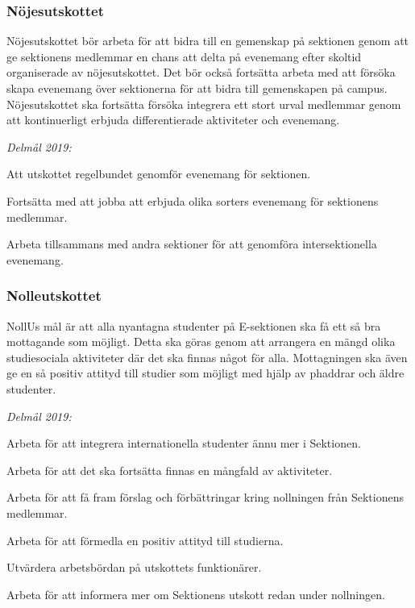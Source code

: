 \documentclass[../_main/handlingar.tex]{subfiles}
\begin{document}
\subsubsection*{Nöjesutskottet}
Nöjesutskottet bör arbeta för att bidra till en gemenskap på sektionen genom att ge sektionens medlemmar en chans att delta på evenemang efter skoltid organiserade av nöjesutskottet. Det bör också fortsätta arbeta med att försöka skapa evenemang över sektionerna för att bidra till gemenskapen på campus. Nöjesutskottet ska fortsätta försöka integrera ett stort urval medlemmar genom att kontinuerligt erbjuda differentierade aktiviteter och evenemang.

\emph{Delmål 2019:}
\begin{dashlist}
    \item Att utskottet regelbundet genomför evenemang för sektionen. 
    \item Fortsätta med att jobba att erbjuda olika sorters evenemang för sektionens medlemmar.
    \item Arbeta tillsammans med andra sektioner för att genomföra intersektionella evenemang. 
\end{dashlist}

\newpage

\subsubsection*{Nolleutskottet}
NollUs mål är att alla nyantagna studenter på E-sektionen ska få ett så bra mottagande som möjligt. Detta ska göras genom att arrangera en mängd olika studiesociala aktiviteter där det ska finnas något för alla. Mottagningen ska även ge en så positiv attityd till studier som möjligt med hjälp av phaddrar och äldre studenter.

\emph{Delmål 2019:}
\begin{dashlist}
    \item Arbeta för att integrera internationella studenter ännu mer i Sektionen.
    \item Arbeta för att det ska fortsätta finnas en mångfald av aktiviteter.
    \item Arbeta för att få fram förslag och förbättringar kring nollningen från Sektionens medlemmar.
    \item Arbeta för att förmedla en positiv attityd till studierna.
    \item Utvärdera arbetsbördan på utskottets funktionärer.
    \item Arbeta för att informera mer om Sektionens utskott redan under nollningen.        
\end{dashlist}
\end{document}
